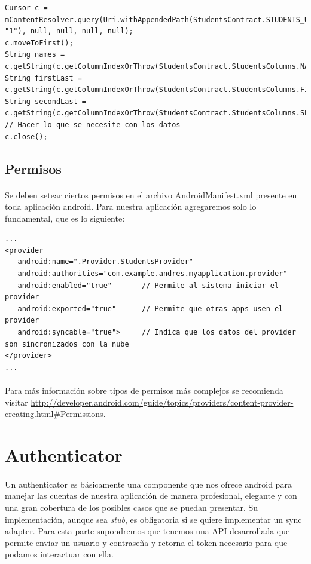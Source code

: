 \documentclass[10pt]{extarticle}
\begin{document}
\begin{lstlisting}
Cursor c = mContentResolver.query(Uri.withAppendedPath(StudentsContract.STUDENTS_URI, "1"), null, null, null, null);
c.moveToFirst();
String names = c.getString(c.getColumnIndexOrThrow(StudentsContract.StudentsColumns.NAMES));
String firstLast = c.getString(c.getColumnIndexOrThrow(StudentsContract.StudentsColumns.FIRST_LASTNAME));
String secondLast = c.getString(c.getColumnIndexOrThrow(StudentsContract.StudentsColumns.SECOND_LASTNAME));
// Hacer lo que se necesite con los datos
c.close();

\end{lstlisting}


\subsection{Permisos}

\paragraph{}
Se deben setear ciertos permisos en el archivo AndroidManifest.xml presente en toda aplicación android. Para nuestra aplicación agregaremos solo lo fundamental, que es lo siguiente:

\begin{lstlisting}
...
<provider
   android:name=".Provider.StudentsProvider"
   android:authorities="com.example.andres.myapplication.provider"
   android:enabled="true"		// Permite al sistema iniciar el provider
   android:exported="true"		// Permite que otras apps usen el provider
   android:syncable="true">		// Indica que los datos del provider son sincronizados con la nube
</provider>
...
\end{lstlisting}

\paragraph{}
Para más información sobre tipos de permisos más complejos se recomienda visitar \url{http://developer.android.com/guide/topics/providers/content-provider-creating.html\#Permissions}.


\section{Authenticator}

\paragraph{}
Un authenticator es básicamente una componente que nos ofrece android para manejar las cuentas de nuestra aplicación de manera profesional, elegante y con una gran cobertura de los posibles casos que se puedan presentar. Su implementación, aunque sea \textit{stub}, es obligatoria si se quiere implementar un sync adapter. Para esta parte supondremos que tenemos una API desarrollada que permite enviar un usuario y contraseña y retorna el token necesario para que podamos interactuar con ella.
\end{document}

